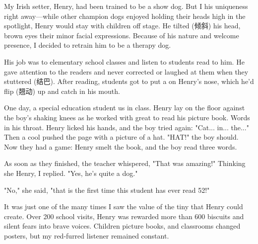 \documentclass{英语试卷}
\begin{document}
\par My Irish setter, Henry, had been trained to be a show dog. But I  his uniqueness right away—while other champion dogs enjoyed holding their heads high in the spotlight, Henry would stay with children off stage. He tilted (倾斜) his head, brown eyes  their minor facial expressions. Because of his  nature and welcome presence, I decided to retrain him to be a therapy dog.\par
\par His job was to  elementary school classes and listen to students read to him. He gave  attention to the readers and never corrected or laughed at them when they stuttered (结巴). After reading, students got to put a  on Henry's nose, which he'd flip (翘动) up and catch in his mouth.\par
\par One day, a special education student  us in class. Henry lay on the floor against the boy's shaking knees as he worked with great  to read his picture book. Words  in his throat. Henry licked his hands, and the boy tried again: "Cat... in... the..." Then a cool  pushed the page with a picture of a hat. "HAT!" the boy should. Now they had a game: Henry smelt the book, and the boy read three words.\par
\par As soon as they finished, the teacher whispered, "That was amazing!" Thinking she  Henry, I replied. "Yes, he's quite a dog."\par
\par "No," she said, "that is the first time this student has ever read 52!"\par
\par It was just one of the many times I saw the value of the tiny  that Henry could create. Over 200 school visits, Henry was rewarded more than 600 biscuits and  silent fears into brave voices. Children  picture books, and classrooms changed posters, but my red-furred listener remained constant.\par
{}
\end{document}
